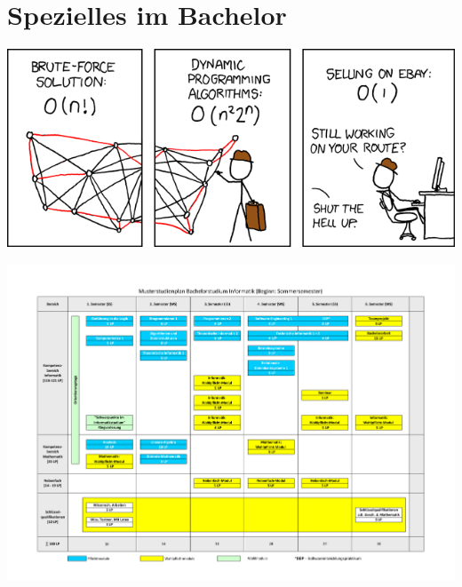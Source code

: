 \documentclass[]{papertex}
\begin{document}
	\section{Spezielles im Bachelor}
		\label{bachelor}
		
		
		\newpage
		\begin{multicols}{2}
		
		
		\end{multicols}
		\begin{center}
		\includegraphics[totalheight=6cm]{bilder/XKCD/travelling_salesman}
		\end{center}
		\begin{minipage}{1.0\linewidth}
			\begin{center}     
			\label{musterstudienplan}
			\includegraphics[angle=90, totalheight=\textheight, width=\textwidth ]{bilder/studienplan_bsc_ss/bscinformatikssneu42011.pdf}
			\end{center}  
		\end{minipage}
		\newpage
\end{document}
